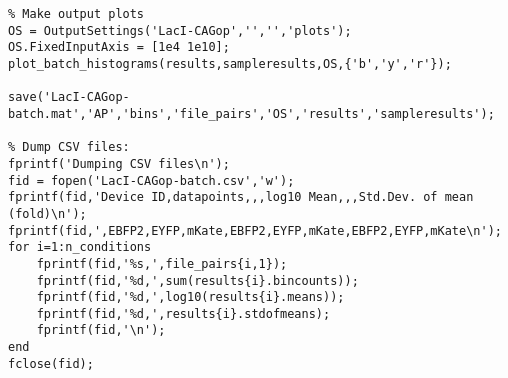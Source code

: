 \begin{minipage}{0.95\textwidth} 
\begin{lstlisting}
% Make output plots
OS = OutputSettings('LacI-CAGop','','','plots');
OS.FixedInputAxis = [1e4 1e10];
plot_batch_histograms(results,sampleresults,OS,{'b','y','r'});

save('LacI-CAGop-batch.mat','AP','bins','file_pairs','OS','results','sampleresults');

% Dump CSV files:
fprintf('Dumping CSV files\n');
fid = fopen('LacI-CAGop-batch.csv','w');
fprintf(fid,'Device ID,datapoints,,,log10 Mean,,,Std.Dev. of mean (fold)\n'); 
fprintf(fid,',EBFP2,EYFP,mKate,EBFP2,EYFP,mKate,EBFP2,EYFP,mKate\n'); 
for i=1:n_conditions
    fprintf(fid,'%s,',file_pairs{i,1});
    fprintf(fid,'%d,',sum(results{i}.bincounts));
    fprintf(fid,'%d,',log10(results{i}.means));
    fprintf(fid,'%d,',results{i}.stdofmeans);
    fprintf(fid,'\n');
end
fclose(fid);
\end{lstlisting}
\end{minipage}




